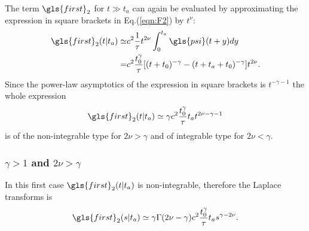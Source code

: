 The term $\gls{first}_2$ for $t \gg t_a$ can again be 
evaluated by approximating the expression in square brackets in Eq.(\ref{eqn:F2}) by $t^\nu$: 
\begin{align}
 \gls{first}_2(t|t_a) \simeq & c^2  \frac{1}{\tau} t^{2\nu} \int_0^{t_a} \gls{psi}(t+y)dy \\
 =& c^2 \frac{ t_0^\gamma }{\tau} [(t+t_0)^{-\gamma}-(t+t_a+t_0)^{-\gamma}]t^{2\nu}. 
 \label{F2lagrer1}
\end{align}
Since the power-law asymptotics of the expression in square brackets is $t^{-\gamma -1}$ the whole expression
\begin{equation}
 \gls{first}_2(t|t_a) \simeq \gamma c^2  \frac{t_0^\gamma }{\tau}t_a t^{2\nu-\gamma -1}
\end{equation}
is of the non-integrable type for $2\nu > \gamma$ and of integrable type for $2 \nu < \gamma$.

\subsubsection{$\gamma>1$ and $2\nu > \gamma$} 
In this first case $\gls{first}_2(t|t_a)$ is non-integrable, therefore the Laplace transforms is 
\begin{equation}
 \gls{first}_2(s|t_a) \simeq \gamma\Gamma (2\nu-\gamma) c^2\frac{t_0^\gamma}{\tau}t_a s^{\gamma - 2\nu}.
\end{equation}

